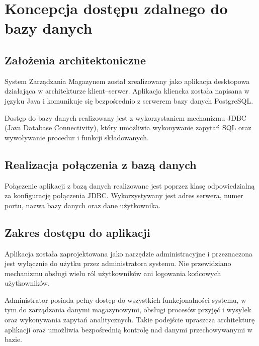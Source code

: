 \chapter{Koncepcja dostępu zdalnego do bazy danych}

\section{Założenia architektoniczne}

System Zarządzania Magazynem został zrealizowany jako aplikacja
desktopowa działająca w architekturze klient--serwer.
Aplikacja kliencka została napisana w języku Java i komunikuje się
bezpośrednio z serwerem bazy danych PostgreSQL.

Dostęp do bazy danych realizowany jest z wykorzystaniem mechanizmu
JDBC (Java Database Connectivity), który umożliwia wykonywanie
zapytań SQL oraz wywoływanie procedur i funkcji składowanych.

\section{Realizacja połączenia z bazą danych}

Połączenie aplikacji z bazą danych realizowane jest poprzez klasę
odpowiedzialną za konfigurację połączenia JDBC. Wykorzystywany jest
adres serwera, numer portu, nazwa bazy danych oraz dane użytkownika.

\section{Zakres dostępu do aplikacji}

Aplikacja została zaprojektowana jako narzędzie administracyjne
i przeznaczona jest wyłącznie do użytku przez administratora systemu.
Nie przewidziano mechanizmu obsługi wielu ról użytkowników ani
logowania końcowych użytkowników.

Administrator posiada pełny dostęp do wszystkich funkcjonalności
systemu, w tym do zarządzania danymi magazynowymi, obsługi procesów
przyjęć i wysyłek oraz wykonywania zapytań analitycznych.
Takie podejście upraszcza architekturę aplikacji oraz umożliwia
bezpośrednią kontrolę nad danymi przechowywanymi w bazie.

